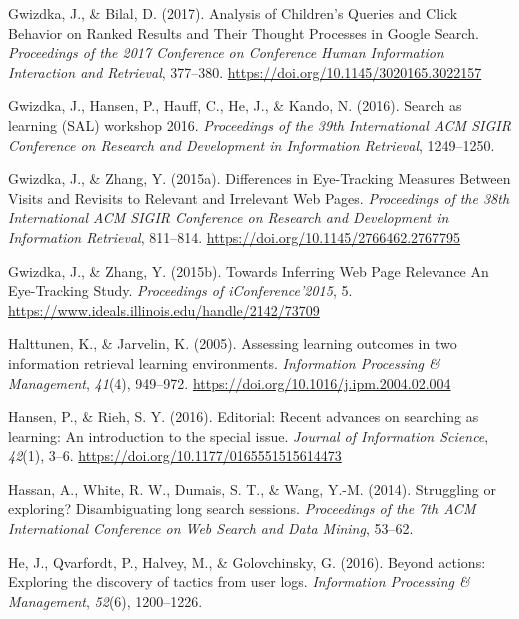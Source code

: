 \documentclass[letterpaper, nobind]{templates/ociamthesis}
\newlength{\cslhangindent}
\newenvironment{CSLReferences}[2] %
 {%
  \setlength{\parindent}{0pt}
  \ifodd #1
  \let\oldpar\par
  \def\par{\hangindent=\cslhangindent\oldpar}
  \fi
  \setlength{\parskip}{1mm}
  \setlength{\baselineskip}{6mm}
 }%
 {}
\begin{document}
\begin{CSLReferences}{1}{0}
\leavevmode{}%
Gwizdka, J., \& Bilal, D. (2017). Analysis of {Children}'s {Queries} and {Click Behavior} on {Ranked Results} and {Their Thought Processes} in {Google Search}. \emph{Proceedings of the 2017 {Conference} on {Conference Human Information Interaction} and {Retrieval}}, 377--380. \url{https://doi.org/10.1145/3020165.3022157}

\leavevmode{}%
Gwizdka, J., Hansen, P., Hauff, C., He, J., \& Kando, N. (2016). Search as learning (SAL) workshop 2016. \emph{Proceedings of the 39th International ACM SIGIR Conference on Research and Development in Information Retrieval}, 1249--1250.

\leavevmode{}%
Gwizdka, J., \& Zhang, Y. (2015a). Differences in {Eye}-{Tracking Measures Between Visits} and {Revisits} to {Relevant} and {Irrelevant Web Pages}. \emph{Proceedings of the 38th {International ACM SIGIR Conference} on {Research} and {Development} in {Information Retrieval}}, 811--814. \url{https://doi.org/10.1145/2766462.2767795}

\leavevmode{}%
Gwizdka, J., \& Zhang, Y. (2015b). Towards {Inferring Web Page Relevance} \textendash{} {An Eye}-{Tracking Study}. \emph{Proceedings of {iConference}'2015}, 5. \url{https://www.ideals.illinois.edu/handle/2142/73709}

\leavevmode{}%
Halttunen, K., \& Jarvelin, K. (2005). Assessing learning outcomes in two information retrieval learning environments. \emph{Information Processing \& Management}, \emph{41}(4), 949--972. \url{https://doi.org/10.1016/j.ipm.2004.02.004}

\leavevmode{}%
Hansen, P., \& Rieh, S. Y. (2016). Editorial: Recent advances on searching as learning: An introduction to the special issue. \emph{Journal of Information Science}, \emph{42}(1), 3--6. \url{https://doi.org/10.1177/0165551515614473}

\leavevmode{}%
Hassan, A., White, R. W., Dumais, S. T., \& Wang, Y.-M. (2014). Struggling or exploring? Disambiguating long search sessions. \emph{Proceedings of the 7th ACM International Conference on Web Search and Data Mining}, 53--62.

\leavevmode{}%
He, J., Qvarfordt, P., Halvey, M., \& Golovchinsky, G. (2016). Beyond actions: Exploring the discovery of tactics from user logs. \emph{Information Processing \& Management}, \emph{52}(6), 1200--1226.


\end{CSLReferences}
\end{document}

